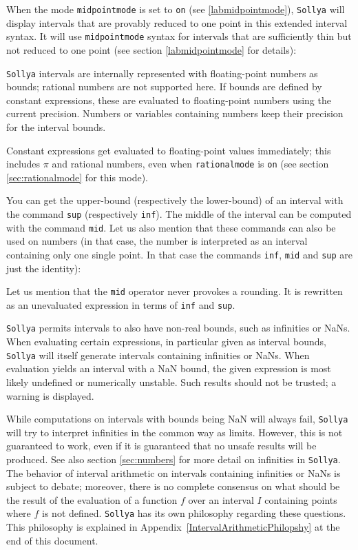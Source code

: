 \documentclass[a4paper]{article}
\newcommand{\com}[1]{\texttt{#1}}
\newcommand{\sollya}{\texttt{Sollya}\xspace}
\begin{document}


When the mode \com{midpointmode} is set to \com{on} (see
\ref{labmidpointmode}), \sollya will display intervals that are
provably reduced to one point in this extended interval syntax. It
will use \com{midpointmode} syntax for intervals that are sufficiently
thin but not reduced to one point (see section \ref{labmidpointmode}
for details):



\sollya intervals are internally represented with floating-point
numbers as bounds; rational numbers are not supported here. If bounds
are defined by constant expressions, these are evaluated to
floating-point numbers using the current precision. Numbers or
variables containing numbers keep their precision for the interval
bounds.

Constant expressions get evaluated to floating-point values
immediately; this includes $\pi$ and rational numbers, even when
\com{rationalmode} is \com{on} (see section \ref{sec:rationalmode} for
this mode).



You can get the upper-bound (respectively the lower-bound) of an interval with the command \com{sup} (respectively \com{inf}). The middle of the interval can be computed with the command \com{mid}. Let us also mention that these commands can also be used on numbers (in that case, the number is interpreted as an interval containing only one single point. In that case the commands \com{inf}, \com{mid} and \com{sup} are just the identity):



Let us mention that the \com{mid} operator never provokes a
rounding. It is rewritten as an unevaluated expression in terms of
\com{inf} and \com{sup}.

\sollya permits intervals to also have non-real bounds, such as
infinities or NaNs. When evaluating certain expressions, in particular
given as interval bounds, \sollya will itself generate intervals
containing infinities or NaNs. When evaluation yields an interval with
a NaN bound, the given expression is most likely undefined or
numerically unstable. Such results should not be trusted; a warning is
displayed.

While computations on intervals with bounds being NaN will always
fail, \sollya will try to interpret infinities in the common way as
limits. However, this is not guaranteed to work, even if it is
guaranteed that no unsafe results will be produced. See also section
\ref{sec:numbers} for more detail on infinities in \sollya. The behavior of interval arithmetic on intervals containing infinities or NaNs is subject to debate; moreover, there is no complete consensus on what should be the result of the evaluation of a function $f$ over an interval $I$ containing points where $f$ is not defined. \sollya has its own philosophy regarding these questions. This philosophy is explained in Appendix~\ref{IntervalArithmeticPhilopshy} at the end of this document.
\end{document}
